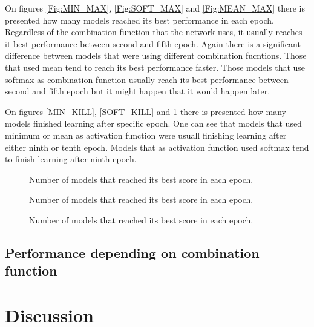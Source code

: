 \documentclass[a4paper,10pt]{report}
\begin{document}
    On figures \ref{Fig:MIN_MAX}, \ref{Fig:SOFT_MAX} and \ref{Fig:MEAN_MAX} there is presented how many models reached its best performance in each epoch. Regardless of the combination function that the network uses, it usually reaches it best performance between second and fifth epoch. Again there is a significant difference between models that were using different combination fucntions. Those that used mean tend to reach its best performance faster. Those models that use softmax as combination function usually reach its best performance between second and fifth epoch but it might happen that it would happen later. 

    On figures \ref{MIN_KILL}, \ref{SOFT_KILL} and \ref{MEAN_KILL} there is presented how many models finished learning after specific epoch. One can see that models that used minimum or mean as activation function were usuall finishing learning after either ninth or tenth epoch. Models that as activation function used softmax tend to finish learning after ninth epoch.
    
    \begin{figure}[!htb]\centering
      \begin{minipage}{\textwidth}
	\caption{Number of models that reached its best score in each epoch.}\label{SOFT_KILL}
      \end{minipage}
      
      \begin {minipage}{0.49\textwidth}
	\caption{Number of models that reached its best score in each epoch.}\label{MIN_KILL}
      \end{minipage}
      \begin {minipage}{0.49\textwidth}
	\caption{Number of models that reached its best score in each epoch.}\label{MEAN_KILL}
      \end{minipage}
    \end{figure}

    \section{Performance depending on combination function}
	
	    
  \chapter{Discussion}
\end{document}

